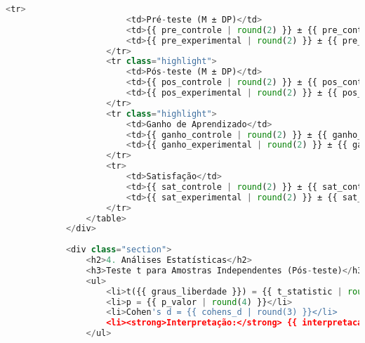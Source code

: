 \begin{pythonbox}
\begin{lstlisting}[language=Python]                           
                    <tr>
                        <td>Pré-teste (M ± DP)</td>
                        <td>{{ pre_controle | round(2) }} ± {{ pre_controle_dp | round(2) }}</td>
                        <td>{{ pre_experimental | round(2) }} ± {{ pre_experimental_dp | round(2) }}</td>
                    </tr>
                    <tr class="highlight">
                        <td>Pós-teste (M ± DP)</td>
                        <td>{{ pos_controle | round(2) }} ± {{ pos_controle_dp | round(2) }}</td>
                        <td>{{ pos_experimental | round(2) }} ± {{ pos_experimental_dp | round(2) }}</td>
                    </tr>
                    <tr class="highlight">
                        <td>Ganho de Aprendizado</td>
                        <td>{{ ganho_controle | round(2) }} ± {{ ganho_controle_dp | round(2) }}</td>
                        <td>{{ ganho_experimental | round(2) }} ± {{ ganho_experimental_dp | round(2) }}</td>
                    </tr>
                    <tr>
                        <td>Satisfação</td>
                        <td>{{ sat_controle | round(2) }} ± {{ sat_controle_dp | round(2) }}</td>
                        <td>{{ sat_experimental | round(2) }} ± {{ sat_experimental_dp | round(2) }}</td>
                    </tr>
                </table>
            </div>
            
            <div class="section">
                <h2>4. Análises Estatísticas</h2>
                <h3>Teste t para Amostras Independentes (Pós-teste)</h3>
                <ul>
                    <li>t({{ graus_liberdade }}) = {{ t_statistic | round(3) }}</li>
                    <li>p = {{ p_valor | round(4) }}</li>
                    <li>Cohen's d = {{ cohens_d | round(3) }}</li>
                    <li><strong>Interpretação:</strong> {{ interpretacao_resultado }}</li>
                </ul>
   \end{lstlisting}
\end{pythonbox}

